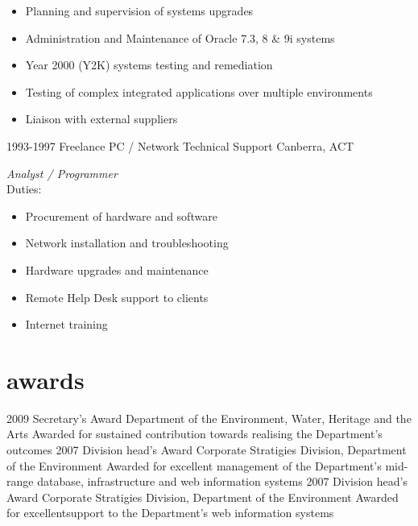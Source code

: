 \documentclass[]{friggeri-cv} %
\begin{document}
\begin{entrylist}
{\begin{itemize}
\item Planning and supervision of systems upgrades
\item Administration and Maintenance of Oracle 7.3, 8 \& 9i systems
\item Year 2000 (Y2K) systems testing and remediation
\item Testing of complex integrated applications over multiple environments
\item Liaison with external suppliers
\end{itemize}}
\entry
{1993-1997}
{Freelance PC / Network Technical Support}
{Canberra, ACT}
{\emph{Analyst / Programmer} \\
Duties:
\begin{itemize}
\item Procurement of hardware and software
\item Network installation and troubleshooting
\item Hardware upgrades and maintenance
\item Remote Help Desk support to clients
\item Internet training
\end{itemize}}
\end{entrylist}


\section{awards}
\begin{entrylist}
\entry
{2009}
{Secretary's Award}
{Department of the Environment, Water, Heritage and the Arts}
{Awarded for sustained contribution towards realising the Department's outcomes}
\entry
{2007}
{Division head's Award}
{Corporate Stratigies Division, Department of the Environment}
{Awarded for excellent management of the Department's mid-range database, infrastructure and web information systems}
\entry
{2007}
{Division head's Award}
{Corporate Stratigies Division, Department of the Environment}
{Awarded for excellentsupport to the Department's web information systems}
\end{entrylist}
\end{document}
